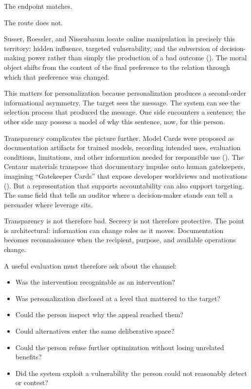 \documentclass[
  10.5pt,
  letterpaper,
]{article}
\providecommand{\tightlist}{%
  \setlength{\itemsep}{0pt}\setlength{\parskip}{0pt}}
\begin{document}
The endpoint matches.

The route does not.

Susser, Roessler, and Nissenbaum locate online manipulation in precisely
this territory: hidden influence, targeted vulnerability, and the
subversion of decision-making power rather than simply the production of
a bad outcome (). The moral object shifts from the content of the final
preference to the relation through which that preference was changed.

This matters for personalization because personalization produces a
second-order informational asymmetry. The target sees the message. The
system can see the selection process that produced the message. One side
encounters a sentence; the other side may possess a model of why this
sentence, now, for this person.

Transparency complicates the picture further. Model Cards were proposed
as documentation artifacts for trained models, recording intended uses,
evaluation conditions, limitations, and other information needed for
responsible use (). The Centaur materials transpose that documentary impulse onto
human gatekeepers, imagining ``Gatekeeper Cards'' that expose developer
worldviews and motivations
(). But a
representation that supports accountability can also support targeting.
The same field that tells an auditor where a decision-maker stands can
tell a persuader where leverage sits.

Transparency is not therefore bad. Secrecy is not therefore protective.
The point is architectural: information can change roles as it moves.
Documentation becomes reconnaissance when the recipient, purpose, and
available operations change.

A useful evaluation must therefore ask about the channel:

\begin{itemize}
\tightlist
\item
  Was the intervention recognizable as an intervention?
\item
  Was personalization disclosed at a level that mattered to the target?
\item
  Could the person inspect why the appeal reached them?
\item
  Could alternatives enter the same deliberative space?
\item
  Could the person refuse further optimization without losing unrelated
  benefits?
\item
  Did the system exploit a vulnerability the person could not reasonably
  detect or contest?
\end{itemize}
\end{document}

